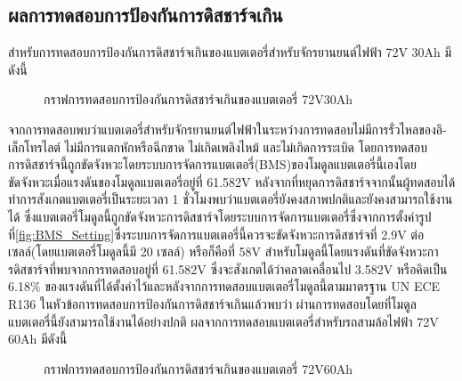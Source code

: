 \subsection{ผลการทดสอบการป้องกันการดิสชาร์จเกิน}
สำหรับการทดสอบการป้องกันการดิสชาร์จเกินของแบตเตอรี่สำหรับจักรยานยนต์ไฟฟ้า 72V 30Ah มีดังนี้
\begin{center}
	\begin{figure}[H]
		\centering
		\captionsetup{justification=centering,margin=2cm}
		\caption{กราฟการทดสอบการป้องกันการดิสชาร์จเกินของแบตเตอรี่ 72V30Ah}
	\end{figure}
\end{center}
จากการทดสอบพบว่าแบตเตอรี่สำหรับจักรยานยนต์ไฟฟ้าในระหว่างการทดสอบไม่มีการรั่วไหลของอิ-เล็กโทรไลต์ ไม่มีการแตกหักหรือฉีกขาด ไม่เกิดเพลิงไหม้ และไม่เกิดการระเบิด
โดยการทดสอบ\\การดิสชาร์จนี้ถูกขัดจังหวะโดยระบบการจัดการแบตเตอรี่(BMS)ของโมดูลแบตเตอรี่นี้เองโดยขัดจังหวะเมื่อแรงดันของโมดูลแบตเตอรี่อยู่ที่ 61.582V 
หลังจากที่หยุดการดิสชาร์จจากนั้นผู้ทดสอบได้ทำการสังเกตแบตเตอรี่เป็นระยะเวลา 1 ชั่วโมงพบว่าแบตเตอรี่ยังคงสภาพปกติและยังคงสามารถใช้งานได้
ซึ่งแบตเตอรี่โมดูลนี้ถูกขัดจังหวะการดิสชาร์จโดยระบบการจัดการแบตเตอรี่ซึ่งจากการตั้งค่ารูปที่\ref{fig:BMS_Setting}ซึ่งระบบการจัดการแบตเตอรี่นี้ควรจะขัดจังหวะการดิสชาร์จที่
2.9V ต่อเซลล์(โดยแบตเตอรี่โมดูลนี้มี 20 เซลล์) หรือก็คือที่ 58V สำหรับโมดูลนี้โดยแรงดันที่ขัดจังหวะการดิสชาร์จที่พบจากการทดสอบอยู่ที่ 61.582V ซึ่งจะสังเกตได้ว่าคลาดเคลื่อนไป
3.582V หรือคิดเป็น 6.18\% ของแรงดันที่ได้ตั้งค่าไว้และหลังจากการทดสอบแบตเตอรี่โมดูลนี้ตามมาตรฐาน UN ECE R136 ในหัวข้อการทดสอบการป้องกันการดิสชาร์จเกินแล้วพบว่า
ผ่านการทดสอบโดยที่โมดูลแบตเตอรี่นี้ยังสามารถใช้งานได้อย่างปกติ
\newpage
ผลจากการทดสอบแบตเตอรี่สำหรับรถสามล้อไฟฟ้า 72V 60Ah มีดังนี้
\begin{center}
	\begin{figure}[H]
		\centering
		\captionsetup{justification=centering,margin=2cm}
		\caption{กราฟการทดสอบการป้องกันการดิสชาร์จเกินของแบตเตอรี่ 72V60Ah}
	\end{figure}
\end{center}

